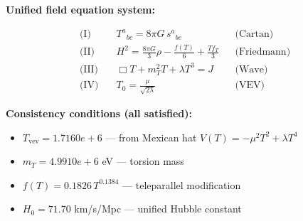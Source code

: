
\textbf{Unified field equation system:}

\begin{align}
  \text{(I)} \quad & T^a{}_{bc} = 8\pi G \, s^a{}_{bc} && \text{(Cartan)} \\
  \text{(II)} \quad & H^2 = \frac{8\pi G}{3}\rho - \frac{f(T)}{6} + \frac{Tf_T}{3} && \text{(Friedmann)} \\
  \text{(III)} \quad & \Box T + m_T^2 T + \lambda T^3 = J && \text{(Wave)} \\
  \text{(IV)} \quad & T_0 = \frac{\mu}{\sqrt{2\lambda}} && \text{(VEV)}
\end{align}

\textbf{Consistency conditions (all satisfied):}
\begin{itemize}
  \item $T_{\text{vev}} = 1.7160e+6$ — from Mexican hat $V(T) = -\mu^2 T^2 + \lambda T^4$
  \item $m_T = 4.9910e+6$ eV — torsion mass
  \item $f(T) = 0.1826 \, T^{0.1384}$ — teleparallel modification
  \item $H_0 = 71.70$ km/s/Mpc — unified Hubble constant
\end{itemize}